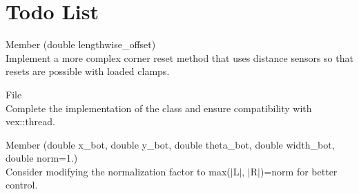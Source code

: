 \chapter{Todo List}
\hypertarget{todo}{}\label{todo}

\begin{DoxyRefList}
\item[Member \doxylink{class_chassis_adbcb65af5fcb48e2559c6df3c725320c}{Chassis\+::corner\+\_\+reset} (double lengthwise\+\_\+offset)]\hfill \\
\label{todo__todo000001}%
%
Implement a more complex corner reset method that uses distance sensors so that resets are possible with loaded clamps.  
\item[File \doxylink{execution__graph_8hpp}{execution\+\_\+graph.hpp} ]\hfill \\
\label{todo__todo000002}%
%
Complete the implementation of the  class and ensure compatibility with vex\+::thread.  
\item[Member \doxylink{class_pursuit_a6059baedaa5c25f44df43fa68a0aeeff}{Pursuit\+::get\+\_\+relative\+\_\+steering} (double x\+\_\+bot, double y\+\_\+bot, double theta\+\_\+bot, double width\+\_\+bot, double norm=1.\+0)]\hfill \\
\label{todo__todo000003}%
%
Consider modifying the normalization factor to max(\texorpdfstring{$\vert$}{|}\+L\texorpdfstring{$\vert$}{|}, \texorpdfstring{$\vert$}{|}\+R\texorpdfstring{$\vert$}{|})=norm for better control. 
\end{DoxyRefList}